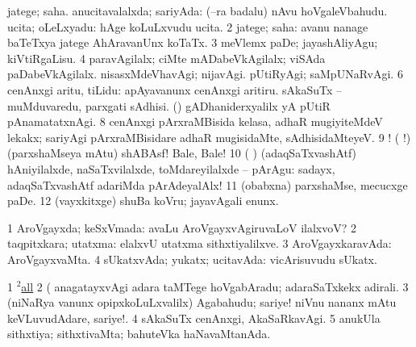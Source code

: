 \noindent 
\gl{\pagu}
\expl{}
\bmng
\bnum
{}  
\banum
{} jatege; saha. 
 anucitavalalxda; sariyAda:  (--ra badalu) nAvu hoVgaleVbahudu. 
 ucita; oLeLxyadu:  hAge koLuLxvudu ucita. 
\eanum
\numie
\num{2}  jatege; saha:  avanu nanage baTeTxya jatege AhAravanUnx koTaTx. 
\num{3}  meVlemx paDe; jayashAliyAgu; kiVtiRgaLisu. 
\num{4}  paravAgilalx; ciMte mADabeVkAgilalx; viSAda paDabeVkAgilalx. 
  
\banum
{} nisasxMdeVhavAgi; nijavAgi. 
 pUtiRyAgi; saMpUNaRvAgi. 
\eanum
\numie
\num{6}  cenAnxgi aritu, tiLidu:  apAyavanunx cenAnxgi aritiru. 
  
\banum
{} sAkaSuTx -- muMduvaredu, parxgati sAdhisi. 
 (\AmA) gADhaniderxyalilx yA pUtiR pAnamatatxnAgi. 
\eanum
\numie
\num{8}  cenAnxgi pArxraMBisida kelasa, adhaR mugiyiteMdeV lekakx; sariyAgi pArxraMBisidare adhaR mugisidaMte, sAdhisidaMteyeV. 
\num{9} ! ( !) (parxshaMseya mAtu) shABAsf! Bale, Bale! 
\num{10}  ( ) (adaqSaTxvashAtf) hAniyilalxde, naSaTxvilalxde, toMdareyilalxde -- pArAgu:  sadayx, adaqSaTxvashAtf adariMda pArAdeyalAlx! 
\num{11}  (obabxna) parxshaMse, mecucxge paDe. 
\num{12}  (vayxkitxge) shuBa koVru; jayavAgali enunx. 
\enum
\emng
\eentry

\bentry
{} 
\gl{\gu}
\bmng
\bnum
\num{1} AroVgayxda; keSxVmada:  avaLu AroVgayxvAgiruvaLoV ilalxvoV? 
\num{2} taqpitxkara; utatxma:  elalxvU utatxma sithxtiyalilxve. 
\num{3} AroVgayxkaravAda:  AroVgayxvaMta. 
\num{4} sUkatxvAda; yukatx; ucitavAda:  vicArisuvudu sUkatx. 
\enum
\emng

\noindent 
\gl{\pagu}
\expl{}
\bmng
\bnum
\num{1} \hyperref{kandict_a.pdf}{A}{all(2) nuga(4)}{$^2$all}  
\num{2}  (  anagatayxvAgi adara taMTege hoVgabAradu; adaraSaTxkekx adirali. 
\num{3}  (niNaRya \mo vanunx opipxkoLuLxvalilx) Agabahudu; sariye!  niVnu nananx mAtu keVLuvudAdare, sariye!. 
\num{4}  sAkaSuTx cenAnxgi, AkaSaRkavAgi. 
\num{5}  anukUla sithxtiya; sithxtivaMta; bahuteVka haNavaMtanAda. 
\enum
\emng
\eentry

